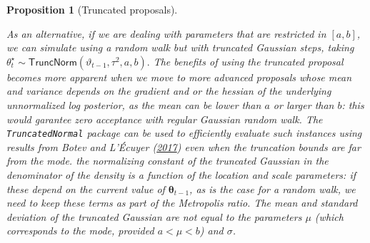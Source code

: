\documentclass[
  11pt,
  letterpaper,
]{scrbook}
\theoremstyle{definition}
\theoremstyle{definition}
\theoremstyle{definition}
\theoremstyle{plain}
\newtheorem{proposition}{Proposition}[chapter]
\theoremstyle{remark}
\begin{document}
\begin{proposition}[Truncated
proposals]\protect\hypertarget{prp-truncated-proposals}{}\label{prp-truncated-proposals}

As an alternative, if we are dealing with parameters that are restricted
in \([a,b]\), we can simulate using a random walk but with truncated
Gaussian steps, taking
\(\theta^{\star}_{t} \sim \mathsf{TruncNorm}(\vartheta_{t-1}, \tau^2, a, b).\)
The benefits of using the truncated proposal becomes more apparent when
we move to more advanced proposals whose mean and variance depends on
the gradient and or the hessian of the underlying unnormalized log
posterior, as the mean can be lower than \(a\) or larger than \(b\):
this would garantee zero acceptance with regular Gaussian random walk.
The \texttt{TruncatedNormal} package can be used to efficiently evaluate
such instances using results from Botev and L'Écuyer
(\protect\hyperlink{ref-LEcuyer.Botev:2017}{2017}) even when the
truncation bounds are far from the mode. the normalizing constant of the
truncated Gaussian in the denominator of the density is a function of
the location and scale parameters: if these depend on the current value
of \(\boldsymbol{\theta}_{t-1}\), as is the case for a random walk, we
need to keep these terms as part of the Metropolis ratio. The mean and
standard deviation of the truncated Gaussian are not equal to the
parameters \(\mu\) (which corresponds to the mode, provided
\(a < \mu < b\)) and \(\sigma\).

\end{proposition}
\end{document}
